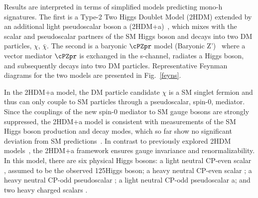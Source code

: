 Results are interpreted in terms of simplified models predicting mono-h signatures. The first is a Type-2 Two Higgs Doublet Model (2HDM) extended by an additional light pseudoscalar boson a (2HDM+a)~\cite{Bauer2017}, which mixes with the scalar and pseudoscalar partners of the SM Higgs boson and decays into two DM particles, $\chi$, $\bar{\chi}$. The second is a baryonic $\cPZpr$ model (Baryonic Z')~\cite{PhysRevD.89.075017} where a vector mediator $\cPZpr$ is exchanged in the s-channel, radiates a Higgs boson, and subsequently decays into two DM 
particles. Representative Feynman diagrams for the two models are presented in Fig.~\ref{feyns}.


In the 2HDM+a model, the DM particle candidate $\chi$ is a SM singlet
fermion and thus can only couple to SM particles through a
pseudoscalar, spin-0, mediator. Since the couplings of the new spin-0
mediator to SM gauge bosons are strongly suppressed, the 2HDM+a model
is consistent with  measurements of the SM Higgs boson production and
decay modes, which so far show no significant deviation from SM predictions~\cite{Khachatryan:2016vau}. In contrast to previously explored 2HDM models~\cite{2HDM,Aaboud:2017yqz,Sirunyan:2017hnk}, the 2HDM+a framework ensures gauge invariance and renormalizability. In this model, there are six physical Higgs bosons:
a light neutral CP-even scalar \Ph, assumed to be the
observed 125\GeV Higgs boson; a heavy neutral CP-even scalar \PH;
a heavy neutral CP-odd pseudoscalar \Az; a light neutral CP-odd pseudoscalar a; and two heavy charged scalars \Hpm. 


